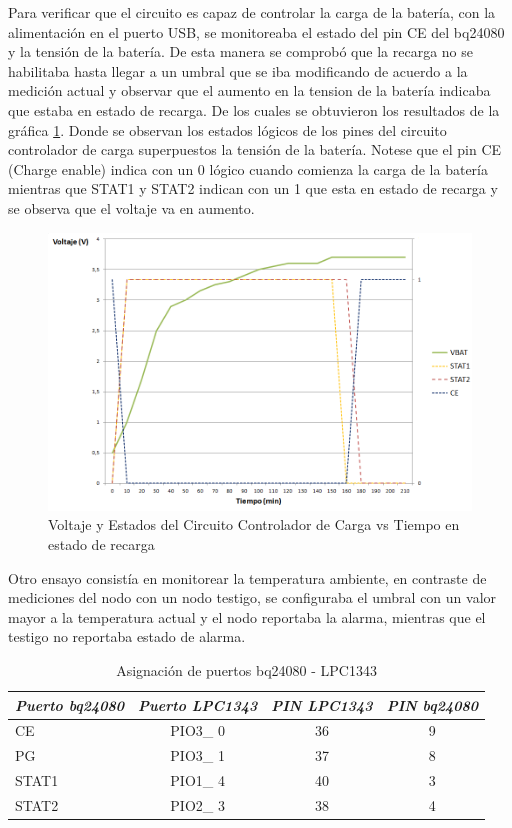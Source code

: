 Para verificar que el circuito es capaz de controlar la carga de la batería, con la alimentación en el puerto USB, se monitoreaba el estado del pin CE del bq24080 y la tensión de la batería. De esta manera se comprobó que la recarga no se habilitaba hasta llegar a un umbral que se iba modificando de acuerdo a la medición actual y observar que el aumento en la tension de la batería indicaba que estaba en estado de recarga. De los cuales se obtuvieron los resultados de la gráfica \ref{fig:carga}. Donde se observan los estados lógicos de los pines del circuito controlador de carga superpuestos la tensión de la batería. Notese que el pin CE (Charge enable) indica con un 0 lógico cuando comienza la carga de la batería mientras que STAT1 y STAT2 indican con un 1 que esta en estado de recarga y se observa que el voltaje va en aumento.

\vspace{10px}
\begin{figure}[h!]
	\centering
    \includegraphics[width=1.2\textwidth]{./Figures/carga.png}
    	\caption{Voltaje y Estados del Circuito Controlador de Carga vs Tiempo en estado de recarga}
	\label{fig:carga}
\end{figure}

Otro ensayo consistía en monitorear la temperatura ambiente, en contraste de mediciones del nodo con un nodo testigo, se configuraba el umbral con un valor mayor a la temperatura actual y el nodo reportaba la alarma, mientras que el testigo no reportaba estado de alarma.

\begin{table}[ht]
	\centering
	\caption{Asignación de puertos bq24080 - LPC1343}
	\begin{tabular}{@{} l *3c @{}}    \toprule
		\emph{\textbf{Puerto bq24080}} & \emph{\textbf{Puerto LPC1343}} & \emph{\textbf{PIN LPC1343}} & \emph{\textbf{PIN bq24080}}\\
		\midrule
		CE &  PIO3\_ 0 & 36 & 9	\\	
		PG	&  PIO3\_ 1 & 37 & 8\\
		STAT1 &  PIO1\_ 4 & 40 & 3\\
		STAT2 &  PIO2\_ 3 & 38 & 4\\
		\bottomrule
		\hline
	\end{tabular}
	\label{tab:bq}
\end{table}

